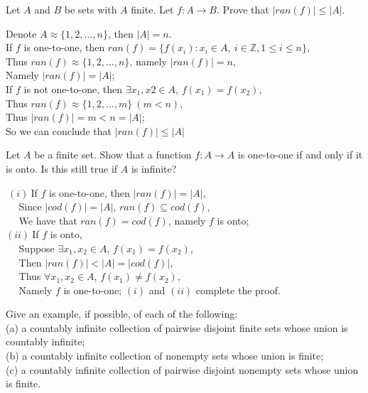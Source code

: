 \documentclass[11pt, a4paper, UTF8]{ctexart}
\begin{document}
\begin{problem}[UD: 21.18]
  Let $A$ and $B$ be sets with $A$ finite. Let $f: A \rightarrow B$. 
  Prove that $|ran(f)| \leq |A|$.
\end{problem}

\begin{solution}
  Denote $A \approx \{ 1,2,...,n \}$, then $|A| = n$.\\
  If $f$ is one-to-one, then $ran(f) = \{ f(x_{i}): x_{i} \in A,~i \in \mathbb{Z}, 1 \leq i \leq n \}$,\\
  Thus $ran(f) \approx \{ 1,2,...,n \}$, namely $|ran(f)| = n$,\\
  Namely $|ran(f)| = |A|$;\\
  If $f$ is not one-to-one, then $\exists x_{1}, x{2} \in A$, 
  $f(x_{1}) = f(x_{2})$,\\
  Thus $ran(f) \approx \{ 1,2,...,m \}~(m < n)$,\\
  Thus $|ran(f)| = m < n = |A|$;\\
  So we can conclude that $|ran(f)| \leq |A|$
\end{solution}

\begin{problem}[UD: 21.19]
  Let $A$ be a finite set. Show that a function $f: A \rightarrow A$ 
  is one-to-one if and only if it is onto. Is this still true if $A$ 
  is infinite?
\end{problem}

\begin{solution}
  $~(i)~$If $f$ is one-to-one, then $|ran(f)| = |A|$,\\
  $~~~~~~$Since $|cod(f)| = |A|$, $ran(f) \subseteq cod(f)$,\\
  $~~~~~~$We have that $ran(f) = cod(f)$, namely $f$ is onto;\\
  $(ii)~$If $f$ is onto,\\
  $~~~~~~$Suppose $\exists x_{1}, x_{2} \in A$, $f(x_{1}) = f(x_{2})$,\\
  $~~~~~~$Then $|ran(f)| < |A| = |cod(f)|$,\\
  $~~~~~~$Thus $\forall x_{1}, x_{2} \in A$, $f(x_{1}) \neq f(x_{2})$,\\
  $~~~~~~$Namely $f$ is one-to-one;
  $(i)$ and $(ii)$ complete the proof.
\end{solution}

\begin{problem}[UD: 22.1]
  Give an example, if possible, of each of the following:\\
  (a) a countably infinite collection of pairwise disjoint finite sets 
  whose union is countably infinite;\\
  (b) a countably infinite collection of nonempty sets whose union is 
  finite;\\
  (c) a countably infinite collection of pairwise disjoint nonempty 
  sets whose union is finite.
\end{problem}
\end{document}
